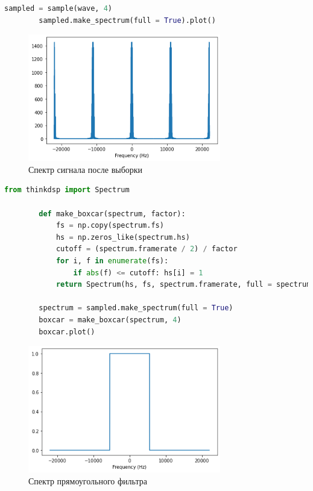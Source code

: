 \documentclass[a4paper, 12pt]{report}
\begin{document}
	\begin{lstlisting}[language=Python,caption=Сделаем выборку сигнала]
		sampled = sample(wave, 4)
		sampled.make_spectrum(full = True).plot()
	\end{lstlisting}
	\begin{figure}[H]
		\centering
		\includegraphics[width=0.75\textwidth]{samp10.png}
		\caption{Спектр сигнала после выборки}
		\label{fig:samp10}
	\end{figure}
	\begin{lstlisting}[language=Python,caption=Функция для построения прямоугольного фильтра]
		from thinkdsp import Spectrum

		def make_boxcar(spectrum, factor):
			fs = np.copy(spectrum.fs)
			hs = np.zeros_like(spectrum.hs)
			cutoff = (spectrum.framerate / 2) / factor
			for i, f in enumerate(fs):
				if abs(f) <= cutoff: hs[i] = 1
			return Spectrum(hs, fs, spectrum.framerate, full = spectrum.full)

		spectrum = sampled.make_spectrum(full = True)
		boxcar = make_boxcar(spectrum, 4)
		boxcar.plot()
	\end{lstlisting}
	\begin{figure}[H]
		\centering
		\includegraphics[width=0.75\textwidth]{samp11.png}
		\caption{Спектр прямоугольного фильтра}
		\label{fig:samp11}
	\end{figure}
\end{document}
